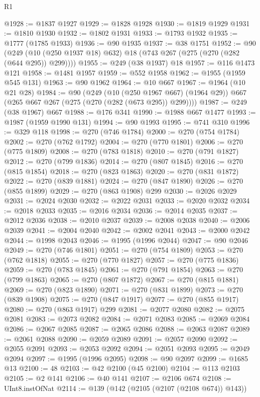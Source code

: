 \begin{lexlean}{R1}
\begin{coremodule}
@1928 := @1837 @1927
@1929 := @1828 @1928
@1930 := @1819 @1929
@1931 := @1810 @1930
@1932 := @1802 @1931
@1933 := @1793 @1932
@1935 := @1777 (@1785 @1933)
@1936 := @90 @1935
@1937 := @38 @1751
@1952 := @90
    (@249 (@10 (@250 @1937 @18) @632) @18 (@743 @267 (@275 (@270 (@282 (@644 @295)) @299))))
@1955 := @249 (@38 @1937) @18
@1957 := @116 @1473 @121
@1958 := @1481 @1957
@1959 := @552 @1958
@1962 := @1955 (@1959 @545 @131)
@1963 := @90 @1962
@1964 := @10 @667
@1967 := @1964 (@10 @21 @28)
@1984 := @90
    (@249
      (@10 (@250 @1967 @667) (@1964 @29))
      @667
      (@265 @667 @267 (@275 (@270 (@282 (@673 @295)) @299))))
@1987 := @249 (@38 @1967) @667
@1988 := @176 @341
@1990 := @1988 @667 @1477
@1993 := @1987 (@1959 @1990 @131)
@1994 := @90 @1993
@1995 := @741 @310
@1996 := @329 @118
@1998 := @270 (@746 @1784)
@2000 := @270 (@754 @1784)
@2002 := @270 (@762 @1792)
@2004 := @270 (@770 @1801)
@2006 := @270 (@775 @1809)
@2008 := @270 (@783 @1818)
@2010 := @270 (@791 @1827)
@2012 := @270 (@799 @1836)
@2014 := @270 (@807 @1845)
@2016 := @270 (@815 @1854)
@2018 := @270 (@823 @1863)
@2020 := @270 (@831 @1872)
@2022 := @270 (@839 @1881)
@2024 := @270 (@847 @1890)
@2026 := @270 (@855 @1899)
@2029 := @270 (@863 @1908) @299
@2030 := @2026 @2029
@2031 := @2024 @2030
@2032 := @2022 @2031
@2033 := @2020 @2032
@2034 := @2018 @2033
@2035 := @2016 @2034
@2036 := @2014 @2035
@2037 := @2012 @2036
@2038 := @2010 @2037
@2039 := @2008 @2038
@2040 := @2006 @2039
@2041 := @2004 @2040
@2042 := @2002 @2041
@2043 := @2000 @2042
@2044 := @1998 @2043
@2046 := @1995 (@1996 @2044)
@2047 := @90 @2046
@2049 := @270 (@746 @1801)
@2051 := @270 (@754 @1809)
@2053 := @270 (@762 @1818)
@2055 := @270 (@770 @1827)
@2057 := @270 (@775 @1836)
@2059 := @270 (@783 @1845)
@2061 := @270 (@791 @1854)
@2063 := @270 (@799 @1863)
@2065 := @270 (@807 @1872)
@2067 := @270 (@815 @1881)
@2069 := @270 (@823 @1890)
@2071 := @270 (@831 @1899)
@2073 := @270 (@839 @1908)
@2075 := @270 (@847 @1917)
@2077 := @270 (@855 @1917)
@2080 := @270 (@863 @1917) @299
@2081 := @2077 @2080
@2082 := @2075 @2081
@2083 := @2073 @2082
@2084 := @2071 @2083
@2085 := @2069 @2084
@2086 := @2067 @2085
@2087 := @2065 @2086
@2088 := @2063 @2087
@2089 := @2061 @2088
@2090 := @2059 @2089
@2091 := @2057 @2090
@2092 := @2055 @2091
@2093 := @2053 @2092
@2094 := @2051 @2093
@2095 := @2049 @2094
@2097 := @1995 (@1996 @2095)
@2098 := @90 @2097
@2099 := @1685 @13
@2100 := 48
@2103 := @42 @2100 (@45 @2100)
@2104 := @113 @2103
@2105 := @2 @141
@2106 := @40 @141
@2107 := @2106 @674
@2108 := UInt8.instOfNat
@2114 := @139 (@142 (@2105 (@2107 (@2108 @674)) @143))

\end{coremodule}
\end{lexlean}
